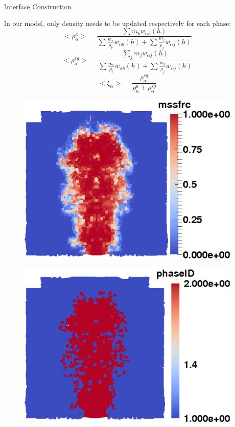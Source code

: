 \documentclass{beamer}
\begin{document}
\begin{frame}{Interface Construction}
\noindent
\begin{minipage}{0.65 \textwidth}
In our model, only density needs to be updated respectively for each phase:
\begin{equation}
<\rho_{\alpha}^a>=\frac{\sum m_b w_{\alpha b} \left(h\right)}{\sum \frac{m_b}{\rho_b} w_{\alpha b} \left(h\right) +\sum \frac{m_j}{\rho_j} w_{\alpha j} \left(h\right)} \label{eq:gov-sph-d1}
\end{equation}
\begin{equation}
<\rho_\alpha^{sg}>=\frac{\sum_j m_j w_{\alpha j} \left(h\right)}{\sum \frac{m_b}{\rho_b} w_{\alpha b} \left(h\right) +\sum \frac{m_j}{\rho_j} w_{\alpha j} \left(h\right)} \label{eq:gov-sph-d2}
\end{equation}
\begin{equation}
<\xi_{\alpha}> = \dfrac{\rho^{sg}_{\alpha}}{\rho_{\alpha}^{a}+\rho_{\alpha}^{sg}}
\label{eq:gov-sph-xi}
\end{equation}
\end{minipage}
\begin{minipage}{0.27 \textwidth}
\begin{figure}
\includegraphics[width=0.95 \textwidth]{./PPT/Interface_msf_rs}
\end{figure}
\begin{figure}
\includegraphics[width=0.95 \textwidth]{./PPT/Interface_phase_rs}

\end{figure}
\end{minipage}
\end{frame}
\end{document}
